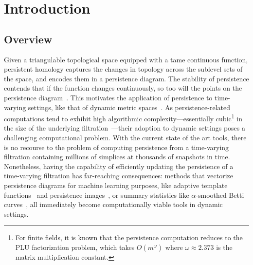 \documentclass{article} %
\begin{document}

\section{Introduction} 
\subsection{Overview}\label{sec:overview} 
Given a triangulable topological space equipped with a  tame continuous function, persistent homology captures the changes in topology across the sublevel sets of the space, and encodes them in a persistence diagram. The stability of persistence contends that   if the function changes continuously, so too will the points on the persistence diagram~\cite{cohen2007stability, cohen2006vines}. 
This motivates the  application of persistence to time-varying  settings, like that of dynamic metric spaces~\cite{kim2020spatiotemporal}. 
As persistence-related computations tend to exhibit high algorithmic complexity---essentially cubic\footnote{For finite fields, it is known that the persistence computation reduces to the PLU factorization problem, which takes $O(m^\omega)$ where $\omega \approx 2.373$ is the matrix multiplication constant.} in the size of the underlying filtration~\cite{morozov2005persistence}---their adoption to dynamic settings poses a challenging computational problem.
With the current state of the art tools, there is no recourse to the problem of computing persistence from a time-varying filtration containing millions of simplices at thousands of snapshots in time.
Nonetheless, having the capability of efficiently updating the persistence of a time-varying filtration has far-reaching consequences: methods that vectorize persistence diagrams for machine learning purposes, like adaptive template functions~\cite{polanco2019adaptive} and persistence images~\cite{adams2017persistence}, or summary statistics like $\alpha$-smoothed Betti curves~\cite{ulmer2019topological}, all immediately become computationally viable tools in dynamic settings. 
  
\end{document}
